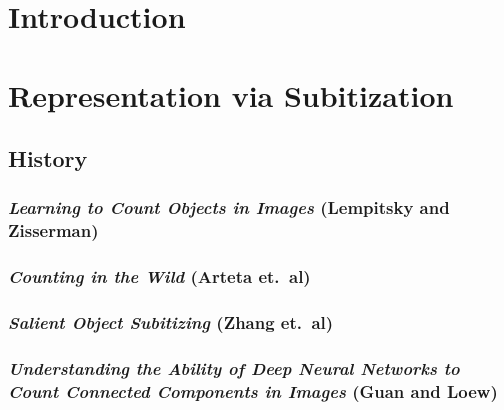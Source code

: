 \documentclass[showabstract,showacknowledgments,showpreface,showdedication]{iuphd}
\begin{document}

\begin{abstract}

\end{abstract}

\newpage


\tableofcontents



\chapter*{Introduction}



\chapter{Representation via Subitization}

\section{History}

\subsection{\textit{Learning to Count Objects in Images} (Lempitsky and Zisserman)}

\subsection{\textit{Counting in the Wild} (Arteta et.\ al)}

\subsection{\textit{Salient Object Subitizing} (Zhang et.\ al)}

\subsection{\textit{Understanding the Ability of Deep Neural Networks to Count Connected Components in Images} (Guan and Loew)}

\end{document}
